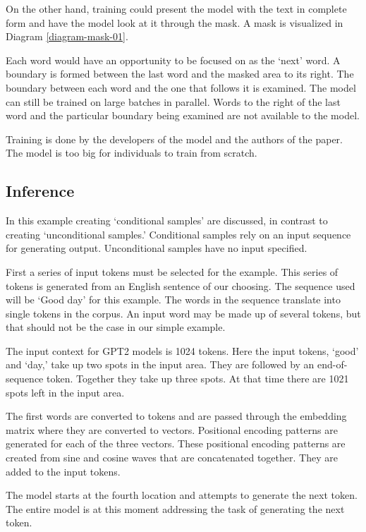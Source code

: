 On the other hand, training could present the model with the text in complete form and have the model look at it through the mask. A mask is visualized in Diagram \ref{diagram-mask-01}.

Each word would have an opportunity to be focused on as the `next' word. A boundary is formed between the last word and the masked area to its right. The boundary between each word and the one that follows it is examined. The model can still be trained on large batches in parallel. Words to the right of the last word and the particular boundary being examined are not available to the model.

Training is done by the developers of the model and the authors of the paper. The model is too big for individuals to train from scratch. 

\subsection{Inference}

In this example creating `conditional samples' are discussed, in contrast to creating `unconditional samples.' Conditional samples rely on an input sequence for generating output. Unconditional samples have no input specified. %

First a series of input tokens must be selected for the example. This series of tokens is generated from an English sentence of our choosing. The sequence used will be `Good day' for this example. The words in the sequence translate into single tokens in the corpus. An input word may be made up of several tokens, but that should not be the case in our simple example.

The input context for GPT2 models is 1024 tokens. Here the input tokens, `good' and `day,'  take up two spots in the input area. They are followed by an end-of-sequence token. Together they take up three spots. At that time there are 1021 spots left in the input area.

The first words are converted to tokens and are passed through the embedding matrix where they are converted to vectors. Positional encoding patterns are generated for each of the three vectors. These positional encoding patterns are created from sine and cosine waves that are concatenated together. They are added to the input tokens.

The model starts at the fourth location and attempts to generate the next token. The entire model is at this moment addressing the task of generating the next token.

